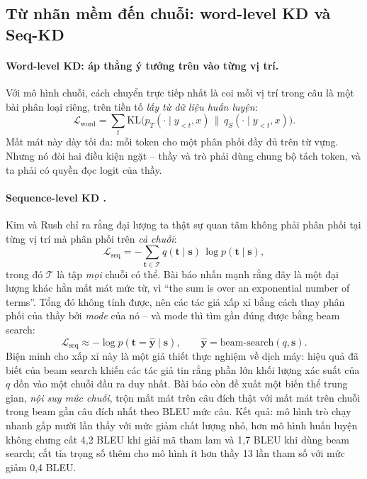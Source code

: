 \subsection{Từ nhãn mềm đến chuỗi: word-level KD và Seq-KD}
\label{ssec:seq_kd}

\paragraph{Word-level KD: áp thẳng ý tưởng trên vào từng vị trí.} Với mô hình chuỗi, cách chuyển trực tiếp nhất là coi mỗi vị trí trong câu là một bài phân loại riêng, trên tiền tố \emph{lấy từ dữ liệu huấn luyện}:
\[
\mathcal{L}_{\text{word}} = \sum_{t} \mathrm{KL}\Big(p_T(\cdot\mid y_{<t}, x)\,\Big\|\, q_S(\cdot\mid y_{<t}, x)\Big).
\]
Mất mát này dày tối đa: mỗi token cho một phân phối đầy đủ trên từ vựng. Nhưng nó đòi hai điều kiện ngặt -- thầy và trò phải dùng chung bộ tách token, và ta phải có quyền đọc logit của thầy.

\paragraph{Sequence-level KD \cite{kim2016sequence}.} Kim và Rush chỉ ra rằng đại lượng ta thật sự quan tâm không phải phân phối tại từng vị trí mà phân phối trên \emph{cả chuỗi}:
\[
\mathcal{L}_{\text{seq}} = -\sum_{\mathbf{t}\in\mathcal{T}} q(\mathbf{t}\mid \mathbf{s})\,\log p(\mathbf{t}\mid \mathbf{s}),
\]
trong đó $\mathcal{T}$ là tập \emph{mọi} chuỗi có thể. Bài báo nhấn mạnh rằng đây là một đại lượng khác hẳn mất mát mức từ, vì ``the sum is over an exponential number of terms''. Tổng đó không tính được, nên các tác giả xấp xỉ bằng cách thay phân phối của thầy bởi \emph{mode} của nó -- và mode thì tìm gần đúng được bằng beam search:
\[
\mathcal{L}_{\text{seq}} \approx -\log p(\mathbf{t} = \hat{\mathbf{y}} \mid \mathbf{s}),
\qquad \hat{\mathbf{y}} = \text{beam-search}(q,\mathbf{s}).
\]
Biện minh cho xấp xỉ này là một giả thiết thực nghiệm về dịch máy: hiệu quả đã biết của beam search khiến các tác giả tin rằng phần lớn khối lượng xác suất của $q$ dồn vào một chuỗi đầu ra duy nhất. Bài báo còn đề xuất một biến thể trung gian, \emph{nội suy mức chuỗi}, trộn mất mát trên câu đích thật với mất mát trên chuỗi trong beam gần câu đích nhất theo BLEU mức câu. Kết quả: mô hình trò chạy nhanh gấp mười lần thầy với mức giảm chất lượng nhỏ, hơn mô hình huấn luyện không chưng cất 4,2 BLEU khi giải mã tham lam và 1,7 BLEU khi dùng beam search; cắt tỉa trọng số thêm cho mô hình ít hơn thầy 13 lần tham số với mức giảm 0,4 BLEU.

